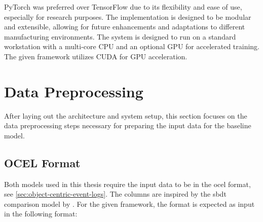 PyTorch was preferred over TensorFlow due to its flexibility and ease of use, especially for research purposes. The implementation is designed to be modular and extensible, allowing for future enhancements and adaptations to different manufacturing environments.
The system is designed to run on a standard workstation with a multi-core CPU and an optional GPU for accelerated training. The given framework utilizes CUDA \autocite{NVIDIA_CUDA} for GPU acceleration.

\section*{Data Preprocessing}
\label{sec:event_log_processing}

After laying out the architecture and system setup, this section focuses on the data preprocessing steps necessary for preparing the input data for the baseline model.

\subsection{OCEL Format}

Both models used in this thesis require the input data to be in the \gls{ocel} format, see \autoref{sec:object-centric-event-logs}. The columns are inspired by the \gls{sbdt} comparison model by \textcite{Schwede2024}. For the given framework, the format is expected as input in the following format:

